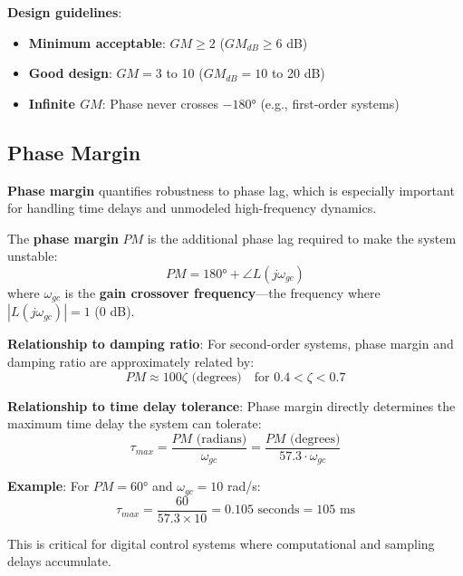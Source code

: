 \textbf{Design guidelines}:
\begin{itemize}
    \item \textbf{Minimum acceptable}: $GM \geq 2$ ($GM_{dB} \geq 6$ dB)
    \item \textbf{Good design}: $GM = 3$ to 10 ($GM_{dB} = 10$ to 20 dB)
    \item \textbf{Infinite $GM$}: Phase never crosses $-180°$ (e.g., first-order systems)
\end{itemize}

\subsection{Phase Margin}
\label{subsec:phase_margin}

\textbf{Phase margin} quantifies robustness to phase lag, which is especially important for handling time delays and unmodeled high-frequency dynamics.

\begin{definition}
The \textbf{phase margin} $PM$ is the additional phase lag required to make the system unstable:
\begin{equation}
    PM = 180° + \angle L(j\omega_{gc})
\end{equation}
where $\omega_{gc}$ is the \textbf{gain crossover frequency}---the frequency where $|L(j\omega_{gc})| = 1$ (0 dB).
\end{definition}

\textbf{Relationship to damping ratio}: For second-order systems, phase margin and damping ratio are approximately related by:
\begin{equation}
    PM \approx 100\zeta \text{ (degrees)} \quad \text{for } 0.4 < \zeta < 0.7
\end{equation}

\textbf{Relationship to time delay tolerance}: Phase margin directly determines the maximum time delay the system can tolerate:
\begin{equation}
    \tau_{max} = \frac{PM \text{ (radians)}}{\omega_{gc}} = \frac{PM \text{ (degrees)}}{57.3 \cdot \omega_{gc}}
    \label{eq:delay_tolerance}
\end{equation}

\textbf{Example}: For $PM = 60°$ and $\omega_{gc} = 10$ rad/s:
\begin{equation}
    \tau_{max} = \frac{60}{57.3 \times 10} = 0.105 \text{ seconds} = 105 \text{ ms}
\end{equation}

This is critical for digital control systems where computational and sampling delays accumulate.

